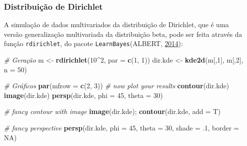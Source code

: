 \documentclass[a4paper]{article}
\newenvironment{Shaded}{\begin{snugshade}}{\end{snugshade}}
\newcommand{\KeywordTok}[1]{\textcolor[rgb]{0.13,0.29,0.53}{\textbf{#1}}}
\newcommand{\DataTypeTok}[1]{\textcolor[rgb]{0.13,0.29,0.53}{#1}}
\newcommand{\DecValTok}[1]{\textcolor[rgb]{0.00,0.00,0.81}{#1}}
\newcommand{\StringTok}[1]{\textcolor[rgb]{0.31,0.60,0.02}{#1}}
\newcommand{\CommentTok}[1]{\textcolor[rgb]{0.56,0.35,0.01}{\textit{#1}}}
\newcommand{\OtherTok}[1]{\textcolor[rgb]{0.56,0.35,0.01}{#1}}
\newcommand{\OperatorTok}[1]{\textcolor[rgb]{0.81,0.36,0.00}{\textbf{#1}}}
\newcommand{\NormalTok}[1]{#1}
\begin{document}
\subsubsection{Distribuição de
Dirichlet}\label{distribuicao-de-dirichlet}

A simulação de dados multivariados da distribuição de Dirichlet, que é
uma versão generalização multivariada da distribuição beta, pode ser
feita através da função \texttt{rdirichlet}, do pacote
\texttt{LearnBayes}(ALBERT, \protect\hyperlink{ref-LearnBayes}{2014}):

\begin{Shaded}
\begin{Highlighting}[]
\CommentTok{# Geração}
\NormalTok{m <-}\StringTok{ }\KeywordTok{rdirichlet}\NormalTok{(}\DecValTok{10}\OperatorTok{^}\DecValTok{2}\NormalTok{, }\DataTypeTok{par =} \KeywordTok{c}\NormalTok{(}\DecValTok{1}\NormalTok{, }\DecValTok{1}\NormalTok{))}
\NormalTok{dir.kde <-}\StringTok{ }\KeywordTok{kde2d}\NormalTok{(m[,}\DecValTok{1}\NormalTok{], m[,}\DecValTok{2}\NormalTok{], }\DataTypeTok{n =} \DecValTok{50}\NormalTok{)}

\CommentTok{# Gráficos}
\KeywordTok{par}\NormalTok{(}\DataTypeTok{mfrow =} \KeywordTok{c}\NormalTok{(}\DecValTok{2}\NormalTok{, }\DecValTok{3}\NormalTok{))}
\CommentTok{# now plot your results}
\KeywordTok{contour}\NormalTok{(dir.kde)}
\KeywordTok{image}\NormalTok{(dir.kde)}
\KeywordTok{persp}\NormalTok{(dir.kde, }\DataTypeTok{phi =} \DecValTok{45}\NormalTok{, }\DataTypeTok{theta =} \DecValTok{30}\NormalTok{)}

\CommentTok{# fancy contour with image}
\KeywordTok{image}\NormalTok{(dir.kde); }\KeywordTok{contour}\NormalTok{(dir.kde, }\DataTypeTok{add =}\NormalTok{ T)}

\CommentTok{# fancy perspective}
\KeywordTok{persp}\NormalTok{(dir.kde, }\DataTypeTok{phi =} \DecValTok{45}\NormalTok{, }\DataTypeTok{theta =} \DecValTok{30}\NormalTok{, }\DataTypeTok{shade =}\NormalTok{ .}\DecValTok{1}\NormalTok{, }\DataTypeTok{border =} \OtherTok{NA}\NormalTok{)}
\end{Highlighting}
\end{Shaded}
\end{document}
